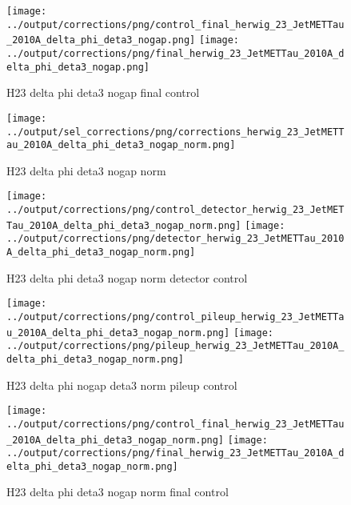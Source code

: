 \documentclass[11pt]{book}
\begin{document}
\begin{figure}[ht]
\centering
\texttt{[image: ../output/corrections/png/control\_final\_herwig\_23\_JetMETTau\_2010A\_delta\_phi\_deta3\_nogap.png]}
\texttt{[image: ../output/corrections/png/final\_herwig\_23\_JetMETTau\_2010A\_delta\_phi\_deta3\_nogap.png]}
\caption{H23 delta phi deta3 nogap final control}
\label{fig:H23_JetMETTau_2010A_delta_phi_deta3_nogap_final_control}
\end{figure}

\begin{figure}[ht]
\centering
\texttt{[image: ../output/sel\_corrections/png/corrections\_herwig\_23\_JetMETTau\_2010A\_delta\_phi\_deta3\_nogap\_norm.png]}
\caption{H23 delta phi deta3 nogap norm}
\label{fig:H23_JetMETTau_2010A_delta_phi_deta3_nogap_norm}
\end{figure}

\begin{figure}[ht]
\centering
\texttt{[image: ../output/corrections/png/control\_detector\_herwig\_23\_JetMETTau\_2010A\_delta\_phi\_deta3\_nogap\_norm.png]}
\texttt{[image: ../output/corrections/png/detector\_herwig\_23\_JetMETTau\_2010A\_delta\_phi\_deta3\_nogap\_norm.png]}
\caption{H23 delta phi deta3 nogap norm detector control}
\label{fig:H23_JetMETTau_2010A_delta_phi_deta3_nogap_norm_detector_control}
\end{figure}

\begin{figure}[ht]
\centering
\texttt{[image: ../output/corrections/png/control\_pileup\_herwig\_23\_JetMETTau\_2010A\_delta\_phi\_deta3\_nogap\_norm.png]}
\texttt{[image: ../output/corrections/png/pileup\_herwig\_23\_JetMETTau\_2010A\_delta\_phi\_deta3\_nogap\_norm.png]}
\caption{H23 delta phi nogap deta3 norm pileup control}
\label{fig:H23_JetMETTau_2010A_delta_phi_deta3_nogap_norm_pileup_control}
\end{figure}


\begin{figure}[ht]
\centering
\texttt{[image: ../output/corrections/png/control\_final\_herwig\_23\_JetMETTau\_2010A\_delta\_phi\_deta3\_nogap\_norm.png]}
\texttt{[image: ../output/corrections/png/final\_herwig\_23\_JetMETTau\_2010A\_delta\_phi\_deta3\_nogap\_norm.png]}
\caption{H23 delta phi deta3 nogap norm final control}
\label{fig:H23_JetMETTau_2010A_delta_phi_deta3_nogap_norm_final_control}
\end{figure}
\end{document}
